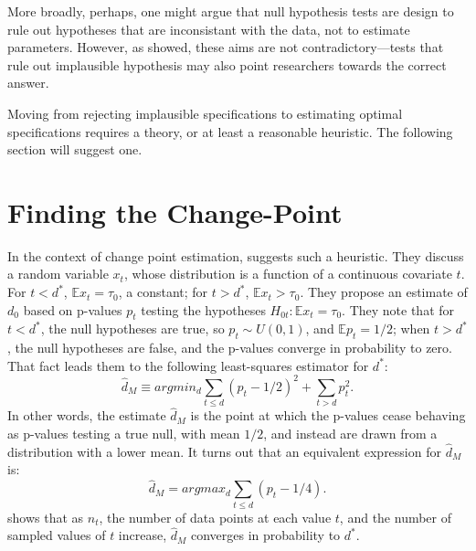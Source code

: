 \documentclass[12pt]{article}\usepackage[]{graphicx}\usepackage[]{color}
\newcommand{\dstar}{d^*}
\newcommand{\dhatm}{\hat{d}_M}
\newcommand{\EE}{\mathbb{E}}
\begin{document}
More broadly, perhaps, one might argue that null hypothesis tests are
design to rule out hypotheses that are inconsistant with the data, not
to estimate parameters.
However, as \citet{hodgeslehmann} showed, these aims are not
contradictory---tests that rule out implausible hypothesis may also
point researchers towards the correct answer.

Moving from rejecting implausible specifications to estimating optimal
specifications requires a theory, or at least a reasonable heuristic.
The following section will suggest one.

\section{Finding the Change-Point}
In the context of change point estimation, \citet{mallik} suggests
such a heuristic.
They discuss a random variable $x_t$, whose distribution is a function
of a continuous covariate $t$.
For $t<d^*$, $\EE x_t=\tau_0$, a constant; for $t>\dstar$, $\EE
x_t>\tau_0$.
They propose an estimate of $d_0$ based on p-values $p_t$
testing the hypotheses $H_{0t}:\EE x_t=\tau_0$.
They note that for $t<\dstar$, the null hypotheses are true, so
$p_t\sim U(0,1)$, and $\EE p_t =1/2$; when $t>\dstar$, the null hypotheses are false, and
the p-values converge in probability to zero.
That fact leads them to the following least-squares estimator for
$\dstar$:
\begin{equation*}
\dhatm\equiv argmin_d \displaystyle\sum_{t\le d} (p_t -1/2)^2 +
\displaystyle\sum_{t>d} p_t^2.
\end{equation*}
In other words, the estimate $\dhatm$ is the point at which the
p-values cease behaving as p-values testing a true null, with mean
$1/2$, and instead are drawn from a distribution with a lower mean.
It turns out that an equivalent expression for $\dhatm$ is:
\begin{equation}\label{eq:mallikSimple}
\dhatm=argmax_d \displaystyle\sum_{t\le d} (p_t-1/4).
\end{equation}
\citet{mallik} shows that as $n_t$, the number of data points at each value
$t$, and the number of sampled values of $t$ increase, $\dhatm$
converges in probability to $\dstar$.
\end{document}
